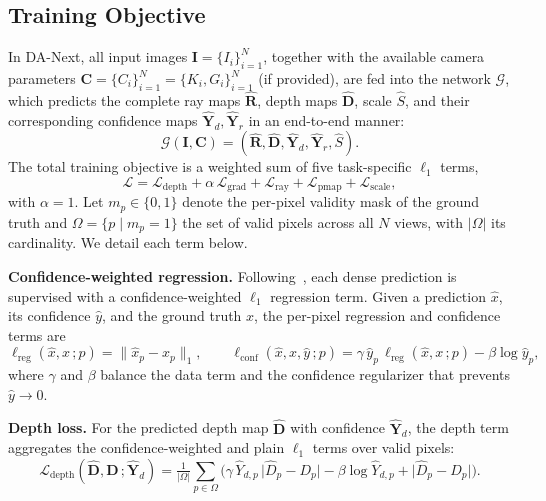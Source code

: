 \documentclass{llmxive}
\providecommand{\ours}{DA-Next\xspace}
\begin{document}
\subsection{Training Objective}
In \ours, all input images $\mathbf{I} = \{I_i\}^N_{i=1}$, together with the available camera parameters $\mathbf{C} = \{C_i\}^N_{i=1}=\{K_i,G_i\}^N_{i=1}$ (if provided), are fed into the network $\mathcal{G}$, which predicts the complete ray maps $\hat{\mathbf{R}}$, depth maps $\hat{\mathbf{D}}$, scale $\hat{S}$, and their corresponding confidence maps $\hat{\mathbf{Y}}_d, \hat{\mathbf{Y}}_r$ in an end-to-end manner:
\begin{equation}
\mathcal{G}\left(\mathbf{I},\mathbf{C}\right)=(\hat{\mathbf{R}},\hat{\mathbf{D}}, \hat{\mathbf{Y}}_d,\hat{\mathbf{Y}}_r,\hat{S}).
\end{equation}
%
The total training objective is a weighted sum of five task-specific $\ell_1$ terms,
\begin{equation}
\mathcal{L} = \mathcal{L}_{\text{depth}} + \alpha\,\mathcal{L}_{\text{grad}} + \mathcal{L}_{\text{ray}} + \mathcal{L}_{\text{pmap}} + \mathcal{L}_{\text{scale}},
\label{eq:total_loss}
\end{equation}
with $\alpha=1$.
%
Let $m_p\!\in\!\{0,1\}$ denote the per-pixel validity mask of the ground truth and $\Omega=\{p\mid m_p=1\}$ the set of valid pixels across all $N$ views, with $|\Omega|$ its cardinality. We detail each term below.

\noindent\textbf{Confidence-weighted regression.}
Following~\citet{wang2024dust3r,leroy2024mast3r}, each dense prediction is supervised with a confidence-weighted $\ell_1$ regression term. 
%
Given a prediction $\hat{x}$, its confidence $\hat{y}$, and the ground truth $x$, the per-pixel regression and confidence terms are
\begin{equation}
\ell_{\text{reg}}(\hat{x},x\,;p) = \| \hat{x}_p-x_p \|_1,\qquad
\ell_{\text{conf}}(\hat{x},x,\hat{y}\,;p) = \gamma\,\hat{y}_p\,\ell_{\text{reg}}(\hat{x},x\,;p) - \beta\log \hat{y}_p,
\label{eq:conf_reg}
\end{equation}
where $\gamma$ and $\beta$ balance the data term and the confidence regularizer that prevents $\hat{y}\!\to\!0$.

\noindent\textbf{Depth loss.}
For the predicted depth map $\hat{\mathbf{D}}$ with confidence $\hat{\mathbf{Y}}_d$, the depth term aggregates the confidence-weighted and plain $\ell_1$ terms over valid pixels:
\begin{equation}
\mathcal{L}_{\text{depth}}(\hat{\mathbf{D}},\mathbf{D}\,;\hat{\mathbf{Y}}_d)
= \tfrac{1}{|\Omega|}\sum_{p\in\Omega}\!\Big(
\gamma\,\hat{Y}_{d,p}\,\big|\hat{D}_p - D_p\big| - \beta\log \hat{Y}_{d,p} + \big|\hat{D}_p - D_p\big|
\Big).
\end{equation}
\end{document}
